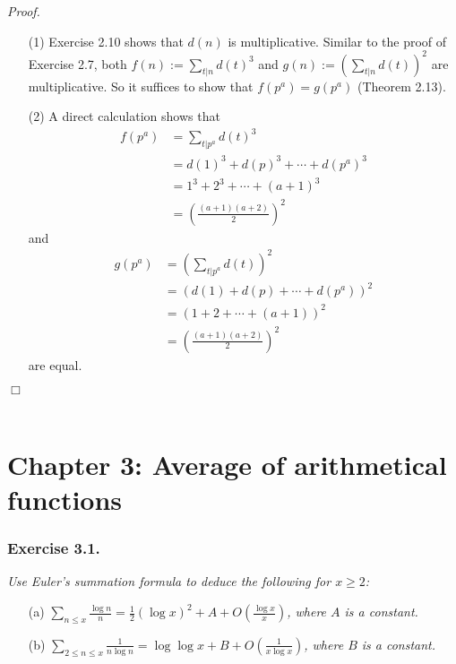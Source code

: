 \documentclass{article}
\begin{document}
\emph{Proof.}
\begin{enumerate}
\item[(1)]
  Exercise 2.10 shows that $d(n)$ is multiplicative.
  Similar to the proof of Exercise 2.7,
  both $f(n) := \sum_{t|n} d(t)^3$ and $g(n) := \left(\sum_{t|n} d(t)\right)^2$
  are multiplicative.
  So it suffices to show that $f(p^a) = g(p^a)$ (Theorem 2.13).

\item[(2)]
  A direct calculation shows that
  \begin{align*}
    f(p^a)
    &= \sum_{t|p^a} d(t)^3 \\
    &= d(1)^3 + d(p)^3 + \cdots + d(p^a)^3 \\
    &= 1^3 + 2^3 + \cdots + (a+1)^3 \\
    &= \left( \frac{(a+1)(a+2)}{2} \right)^2
  \end{align*}
  and
  \begin{align*}
    g(p^a)
    &= \left( \sum_{t|p^a} d(t) \right)^2 \\
    &= (d(1) + d(p) + \cdots + d(p^a))^2 \\
    &= (1 + 2 + \cdots + (a+1))^2 \\
    &= \left( \frac{(a+1)(a+2)}{2} \right)^2
  \end{align*}
  are equal.
\end{enumerate}
$\Box$ \\\\






\newpage
\section*{Chapter 3: Average of arithmetical functions \\}



\subsubsection*{Exercise 3.1.}
\emph{Use Euler's summation formula to deduce the following for $x \geq 2$:}
\begin{enumerate}
\item[(a)]
  \emph{$\sum_{n \leq x} \frac{\log n}{n}
  = \frac{1}{2} (\log x)^2 + A + O\left( \frac{\log x}{x} \right)$,
  where $A$ is a constant.}

\item[(b)]
  \emph{$\sum_{2 \leq n \leq x} \frac{1}{n\log n}
  = \log\log x + B + O\left( \frac{1}{x\log x} \right)$,
  where $B$ is a constant.} \\
\end{enumerate}
\end{document}
